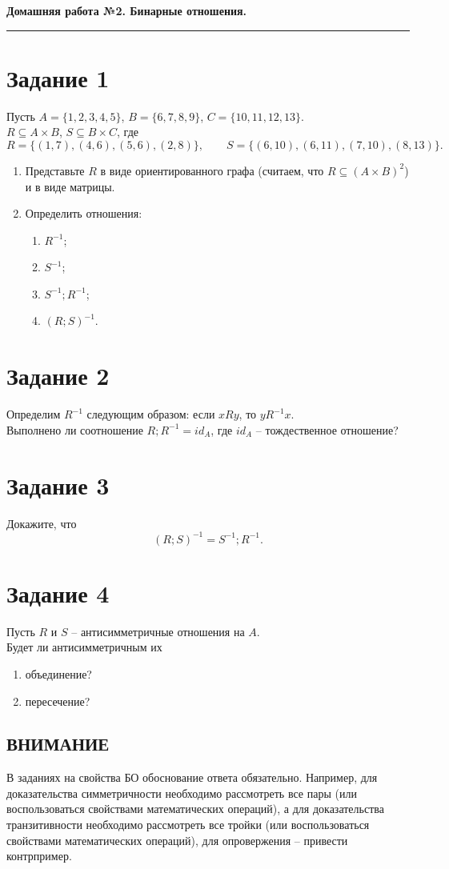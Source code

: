 \documentclass[a4paper,12pt,oneside]{article}
\newcommand{\Task}[1]{\section*{\normalfont\bfseries Задание #1}}
\begin{document}
\begin{center}
    {\Large\bfseries Домашняя работа №2. Бинарные отношения.}\\[2mm]
\end{center}
\vspace{2mm}
\hrule
\vspace{4mm}

\Task{1}
Пусть $A=\{1,2,3,4,5\}$, $B=\{6,7,8,9\}$, $C=\{10,11,12,13\}$.\\
$R\subseteq A\times B$, $S\subseteq B\times C$, где
\[
R=\{(1,7),(4,6),(5,6),(2,8)\},\qquad
S=\{(6,10),(6,11),(7,10),(8,13)\}.
\]
\begin{enumerate}[label=\arabic*)]
\item Представьте $R$ в виде ориентированного графа (считаем, что $R\subseteq (A\times B)^2$) и в виде матрицы.
\item Определить отношения:
\begin{enumerate}[label=\alph*)]
\item $R^{-1}$;
\item $S^{-1}$;
\item $S^{-1};R^{-1}$;
\item $(R;S)^{-1}$.
\end{enumerate}
\end{enumerate}

\Task{2}
Определим $R^{-1}$ следующим образом: если $xRy$, то $yR^{-1}x$.\\
Выполнено ли соотношение $R;R^{-1}=id_A$, где $id_A$ – тождественное отношение?

\Task{3}
Докажите, что
\[
(R;S)^{-1}=S^{-1};R^{-1}.
\]

\Task{4}
Пусть $R$ и $S$ – антисимметричные отношения на $A$.\\
Будет ли антисимметричным их
\begin{enumerate}[label=\alph*)]
\item объединение?
\item пересечение?
\end{enumerate}

\subsection*{ВНИМАНИЕ}
В заданиях на свойства БО обоснование ответа обязательно. Например, для доказательства симметричности необходимо рассмотреть все пары (или воспользоваться свойствами математических операций), а для доказательства транзитивности необходимо рассмотреть все тройки (или воспользоваться свойствами математических операций), для опровержения – привести контрпример.
\end{document}
